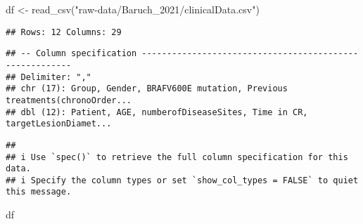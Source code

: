 \documentclass[
]{article}
\newenvironment{Shaded}{\begin{snugshade}}{\end{snugshade}}
\newcommand{\FunctionTok}[1]{\textcolor[rgb]{0.00,0.00,0.00}{#1}}
\newcommand{\NormalTok}[1]{#1}
\newcommand{\OtherTok}[1]{\textcolor[rgb]{0.56,0.35,0.01}{#1}}
\newcommand{\StringTok}[1]{\textcolor[rgb]{0.31,0.60,0.02}{#1}}
\begin{document}
\begin{Shaded}
\begin{Highlighting}[]
\NormalTok{df }\OtherTok{\textless{}{-}} \FunctionTok{read\_csv}\NormalTok{(}\StringTok{"raw{-}data/Baruch\_2021/clinicalData.csv"}\NormalTok{)}
\end{Highlighting}
\end{Shaded}

\begin{verbatim}
## Rows: 12 Columns: 29
\end{verbatim}

\begin{verbatim}
## -- Column specification --------------------------------------------------------
## Delimiter: ","
## chr (17): Group, Gender, BRAFV600E mutation, Previous treatments(chronoOrder...
## dbl (12): Patient, AGE, numberofDiseaseSites, Time in CR, targetLesionDiamet...
\end{verbatim}

\begin{verbatim}
## 
## i Use `spec()` to retrieve the full column specification for this data.
## i Specify the column types or set `show_col_types = FALSE` to quiet this message.
\end{verbatim}

\begin{Shaded}
\begin{Highlighting}[]
\NormalTok{df}
\end{Highlighting}
\end{Shaded}
\end{document}
